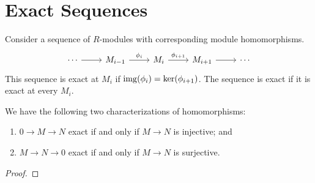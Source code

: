 \section{Exact Sequences}

\begin{definition}
    Consider a sequence of \(R\)-modules with corresponding module homomorphisms.
    \begin{equation*}
        \begin{tikzcd}
            \cdots \arrow{r} & M_{i-1} \arrow{r}{\phi_i} &
            M_i \arrow{r}{\phi_{i+1}} & M_{i+1} \arrow{r} & \cdots
        \end{tikzcd}
    \end{equation*}
    This sequence is exact at \(M_i\) if \(\operatorname{img}(\phi_i) = \ker(\phi_{i+1})\).
    The sequence is exact if it is exact at every \(M_i\).
\end{definition}

\begin{proposition}
    We have the following two characterizations of homomorphisms:
    \begin{enumerate}[label={(\alph*)}, itemsep=0mm]
        \item \(0 \to M \to N\) exact if and only if \(M \to N\) is injective; and
        \item \(M \to N \to 0\) exact if and only if \(M \to N\) is surjective.
    \end{enumerate}
\end{proposition}
\begin{proof}
    
\end{proof}

